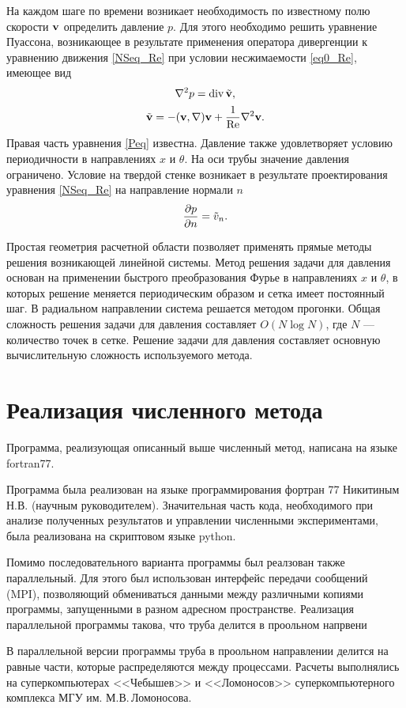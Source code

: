На каждом шаге по времени возникает необходимость по известному полю скорости $\mathbf{v}$ определить давление $p$. Для этого необходимо решить уравнение Пуассона, возникающее в результате применения оператора дивергенции к уравнению движения \eqref{NSeq_Re} при условии несжимаемости \eqref{eq0_Re}, имеющее вид
\begin{equation}\label{Peq}
\nabla^2 p = \operatorname{div} \tilde {\mathbf{v}},
\end{equation}
$$
\tilde {\mathbf{v}} = - (\mathbf{v},\nabla)\mathbf{v} + \frac{1}{\operatorname{Re}}\nabla^2 \mathbf{v}. 
$$
Правая часть уравнения \eqref{Peq} известна. Давление также удовлетворяет условию периодичности в направлениях $x$ и $\theta$. На оси трубы значение давления ограничено. Условие на твердой стенке возникает в результате проектирования уравнения \eqref{NSeq_Re} на направление нормали $n$
$$
\frac{\partial p}{\partial n} = \tilde v_n.
$$


Простая геометрия расчетной области позволяет применять прямые методы решения возникающей линейной системы. Метод решения задачи для давления основан на применении быстрого преобразования Фурье в направлениях $x$ и $\theta$, в которых решение меняется периодическим образом и сетка имеет постоянный шаг. В радиальном направлении система решается методом прогонки. Общая сложность решения задачи для давления составляет $O(N \log N)$, где $N$ --- количество точек в сетке. Решение задачи для давления составляет основную вычислительную сложность используемого метода. 


\section{Реализация численного метода}

Программа, реализующая описанный выше численный метод, написана на языке fortran77. 

Программа была реализован на языке программирования фортран 77 Никитиным Н.В. (научным руководителем). Значительная часть кода, необходимого при анализе полученных результатов и управлении численными экспериментами, была реализована на скриптовом языке python. 


Помимо последовательного варианта программы был реалзован также параллельный. Для этого был использован интерфейс передачи сообщений (MPI), позволяющий обмениваться данными между различными копиями программы, запущенными в разном адресном пространстве. Реализация параллельной программы такова, что труба делится в проольном напрвени

В параллельной версии программы труба в проольном направлении делится на равные части, которые распределяются между процессами. Расчеты выполнялись на суперкомпьютерах <<Чебышев>> и <<Ломоносов>> суперкомпьютерного комплекса МГУ им. М.В.\,Ломоносова. 


